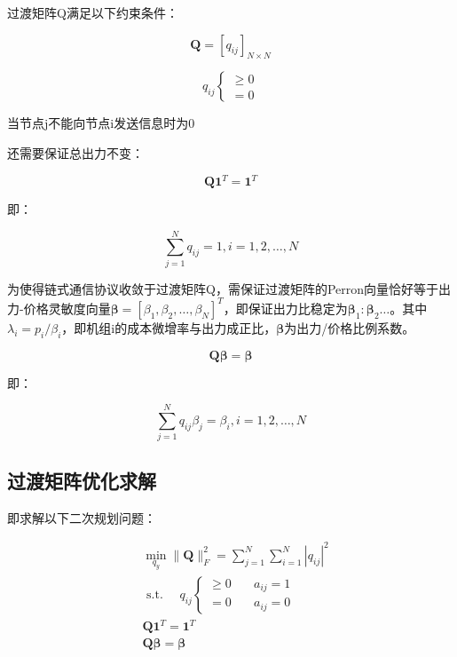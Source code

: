 过渡矩阵Q满足以下约束条件：

\begin{equation}
    \mathbf{Q}=\left[q_{i j}\right]_{N \times N}
\end{equation}

\begin{equation}
    q_{i j}\left\{\begin{array}{l}
    {\geq 0} \\
    {=0}
    \end{array}\right.
\end{equation}

当节点j不能向节点i发送信息时为0

还需要保证总出力不变：

\begin{equation}
    \mathbf{Q} \mathbf{1}^{T}=\mathbf{1}^{T}
\end{equation}

即：

\begin{equation}
    \sum_{j=1}^{N} q_{i j}=1, i=1,2, \ldots, N
\end{equation}

为使得链式通信协议收敛于过渡矩阵Q，需保证过渡矩阵的Perron向量恰好等于出力-价格灵敏度向量$\boldsymbol{\beta}=\left[\beta_{1}, \beta_{2}, \ldots, \beta_{N}\right]^{T}$，即保证出力比稳定为$\boldsymbol{\beta}_{1}: \boldsymbol{\beta}_{2} \ldots$。其中$\lambda_{i}=p_{i} / \beta_{i}$，即机组i的成本微增率与出力成正比，$\boldsymbol{\beta}$为出力/价格比例系数。

\begin{equation}
    \mathbf{Q} \boldsymbol{\beta}=\boldsymbol{\beta}
\end{equation}

即：

\begin{equation}
    \sum_{j=1}^{N} q_{i j} \beta_{j}=\beta_{i}, i=1,2, \ldots, N
\end{equation}

\subsection{过渡矩阵优化求解}

即求解以下二次规划问题：

\begin{equation}
    \begin{aligned}
    &\min _{q_{y}}\|\mathbf{Q}\|_{F}^{2}=\sum_{j=1}^{N} \sum_{i=1}^{N}\left|q_{i j}\right|^{2}\\
    &\text { s.t. } \quad q_{i j}\left\{\begin{array}{ll}
    {\geq 0} & {\quad a_{i j}=1} \\
    {=0} & {\quad a_{i j}=0}
    \end{array}\right.\\
    &\mathbf{Q} \mathbf{1}^{T}=\mathbf{1}^{T}\\
    &\mathbf{Q} \boldsymbol{\beta}=\boldsymbol{\beta}
    \end{aligned}
\end{equation}

